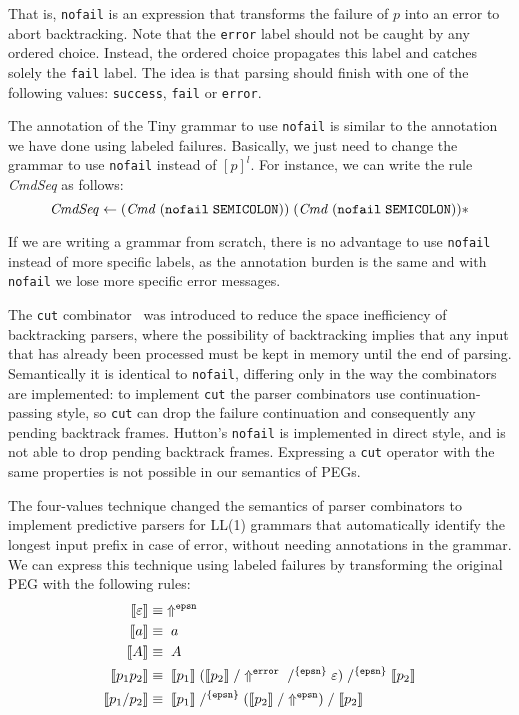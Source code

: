 \documentclass[3p,12pt,singlecolumn]{elsarticle}
\newcommand{\throw}{\Uparrow}
\begin{document}
That is, \texttt{nofail} is an expression that transforms the failure
of $p$ into an error to abort backtracking.
Note that the \texttt{error} label should not be caught by any
ordered choice.
Instead, the ordered choice propagates this label and catches solely
the \texttt{fail} label.
The idea is that parsing should finish with one of the following
values: \texttt{success}, \texttt{fail} or \texttt{error}.

The annotation of the Tiny grammar to use \texttt{nofail} is
similar to the annotation we have done using labeled failures.
Basically, we just need to change the grammar to use
\texttt{nofail} instead of $[p]^{l}$.
For instance, we can write the rule \textit{CmdSeq} as follows:
\[
\it{CmdSeq} \leftarrow \it{(Cmd \; ({\tt nofail \; SEMICOLON})) \;
  (Cmd \; ({\tt nofail \; SEMICOLON}))*}\\
\]

If we are writing a grammar from scratch, there is no advantage to
use \texttt{nofail} instead of more specific labels,
as the annotation burden is the same and with \texttt{nofail} we
lose more specific error messages.

The \texttt{cut} combinator~\cite{rojemo1995epc} was introduced
to reduce the space inefficiency of backtracking parsers, where
the possibility of backtracking implies that any input that has already
been processed must be kept in memory until the end of parsing.
Semantically it is identical to {\tt nofail}, differing only
in the way the combinators are implemented: to implement {\tt cut}
the parser combinators use continuation-passing style, so {\tt cut}
can drop the failure continuation and consequently any pending
backtrack frames. Hutton's {\tt nofail} is implemented in direct style,
and is not able to drop pending backtrack frames.
Expressing a {\tt cut} operator with the same properties
is not possible in our semantics of PEGs.

The four-values technique changed the semantics
of parser combinators to implement predictive parsers for LL(1)
grammars that automatically identify the longest input prefix
in case of error, without needing annotations in the grammar.
We can express this technique using labeled failures by transforming
the original PEG with the following rules:
\begin{align}
\label{fv:e}
\llbracket \varepsilon \rrbracket & \equiv \; \throw^{\tt epsn}\\
\label{fv:a}
\llbracket a \rrbracket & \equiv \; a\\
\label{fv:A}
\llbracket A \rrbracket & \equiv \; A\\
\label{fv:bind}
\llbracket p_1 p_2 \rrbracket & \equiv \;
\llbracket p_1 \rrbracket \;
(\llbracket p_2 \rrbracket \; / \throw^{\tt error} \; /^{\{{\tt epsn}\}} \;
\varepsilon) \; /^{\{{\tt epsn}\}} \; \llbracket p_2 \rrbracket\\
\label{fv:choice}
\llbracket p_1 / p_2 \rrbracket & \equiv \;
\llbracket p_1 \rrbracket \; /^{\{{\tt epsn}\}} \;
(\llbracket p_2 \rrbracket \; / \throw^{\tt epsn}) \; / \;
\llbracket p_2 \rrbracket
\end{align}
\end{document}
